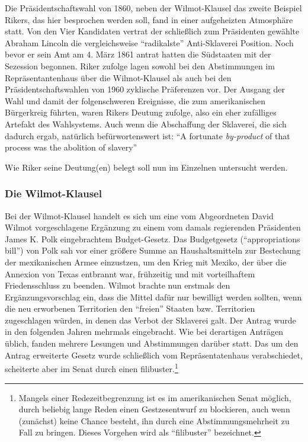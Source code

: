 Die Präsidentschaftswahl von 1860, neben der Wilmot-Klausel das zweite Beispiel
Rikers, das hier besprochen werden soll, fand in einer aufgeheizten Atmosphäre
statt. Von den Vier Kandidaten vertrat der schließlich zum Präsidenten gewählte
Abraham Lincoln die vergleichsweise ``radikalste'' Anti-Sklaverei Position. Noch
bevor er sein Amt am 4. März 1861 antrat hatten die Südstaaten mit der Sezession
begonnen. Riker zufolge lagen sowohl bei den Abstimmungen im
Repräsentantenhaus über die Wilmot-Klausel als auch bei den 
Präsidentschaftswahlen von 1960 zyklische Präferenzen vor. Der Ausgang der Wahl
und damit der folgenschweren Ereignisse, die zum amerikanischen Bürgerkreig
führten, waren Rikers Deutung zufolge, also ein eher zufälliges Artefakt des
Wahlsystems. Auch wenn die Abschaffung der Sklaverei, die sich dadurch
ergab, natürlich befürwortenswert ist: ``A fortunate {\em by-product} of
that process was the abolition of slavery'' \cite[S. 232,
hervorhebung von mir, E.A.]{riker:1982}

Wie Riker seine Deutung(en) belegt soll nun im Einzelnen untersucht werden.

\subsubsection{Die Wilmot-Klausel}

Bei der Wilmot-Klausel handelt es sich um eine vom Abgeordneten David Wilmot
vorgeschlagene Ergänzung zu einem vom damals regierenden Präsidenten James K.
Polk eingebrachtem Budget-Gesetz. Das Budgetgesetz (``appropriations bill'') von
Polk sah vor einer größere Summe an Haushaltsmitteln zur Bestechung der
mexikanischen Armee einzustzen, um den Krieg mit Mexiko, der über die Annexion
von Texas entbrannt war, frühzeitig und mit vorteilhaftem Friedensschluss zu
beenden. Wilmot brachte nun erstmals den Ergänzungsvorschlag ein, dass die Mittel
dafür nur bewilligt werden sollten, wenn die neu erworbenen Territorien den
``freien'' Staaten bzw. Territorien zugeschlagen würden, in denen das Verbot der
Sklaverei galt. Der Antrag wurde in den folgenden Jahren mehrmals eingebracht.
Wie bei derartigen Anträgen üblich, fanden mehrere Lesungen und Abstimmungen
darüber statt. Das um den Antrag erweiterte Gesetz wurde schließlich vom
Repräsentatenhaus verabschiedet, scheiterte aber im Senat durch einen
filibuster.\footnote{Mangels einer Redezeitbegrenzung ist es im amerikanischen
Senat möglich, durch beliebig lange Reden einen Gestzesentwurf zu blockieren,
auch wenn (zunächst) keine Chance besteht, ihn durch eine Abstimmungsmehrheit zu
Fall zu bringen. Dieses Vorgehen wird als ``filibuster'' bezeichnet.}


